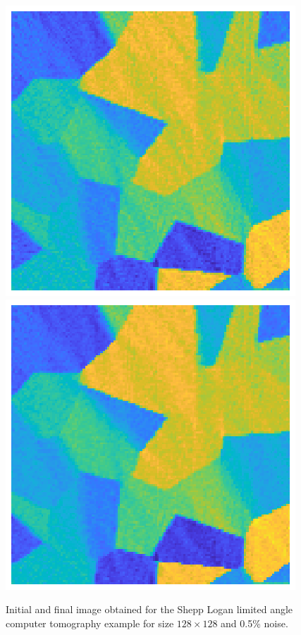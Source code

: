 \begin{figure}[htbp]
\begin{center}
\includegraphics{figures/limited_angle_initial}\includegraphics{figures/limited_angle_final}
\caption{Initial and final image obtained for the Shepp Logan limited angle computer tomography example for size $128 \times 128$ and 0.5\% noise.}
\label{fig:limited_angle_grains_initial_and_final}
\end{center}
\end{figure}

